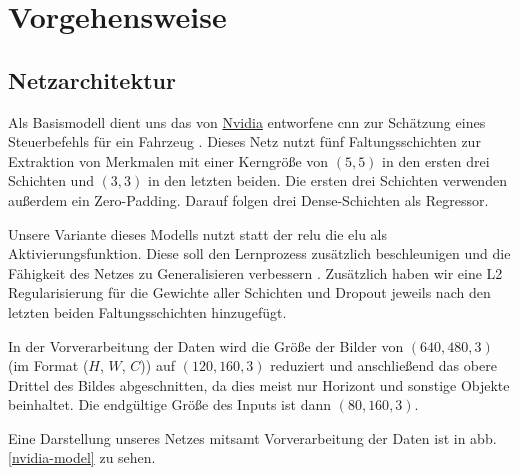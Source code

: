 \chapter{Vorgehensweise}

\section{Netzarchitektur}

Als Basismodell dient uns das von \href{https://www.nvidia.com/en-us/}{Nvidia} entworfene \acs{cnn} zur Schätzung eines Steuerbefehls für ein Fahrzeug \cite{nvidia}. Dieses Netz nutzt fünf Faltungsschichten zur Extraktion von Merkmalen mit einer Kerngröße von $(5, 5)$ in den ersten drei Schichten und $(3, 3)$ in den letzten beiden. Die ersten drei Schichten verwenden außerdem ein Zero-Padding. Darauf folgen drei Dense-Schichten als Regressor.

Unsere Variante dieses Modells nutzt statt der \acs{relu} die \acs{elu} als Aktivierungsfunktion. Diese soll den Lernprozess zusätzlich beschleunigen und die Fähigkeit des Netzes zu Generalisieren verbessern \cite{elu}. Zusätzlich haben wir eine L2 Regularisierung für die Gewichte aller Schichten und Dropout jeweils nach den letzten beiden Faltungsschichten hinzugefügt.

In der Vorverarbeitung der Daten wird die Größe der Bilder von $(640, 480, 3)$ (im Format ($H$, $W$, $C$)) auf $(120, 160, 3)$ reduziert und anschließend das obere Drittel des Bildes abgeschnitten, da dies meist nur Horizont und sonstige Objekte beinhaltet. Die endgültige Größe des Inputs ist dann $(80, 160, 3)$.

Eine Darstellung unseres Netzes mitsamt Vorverarbeitung der Daten ist in \acs{abb.} \ref{nvidia-model} zu sehen.

